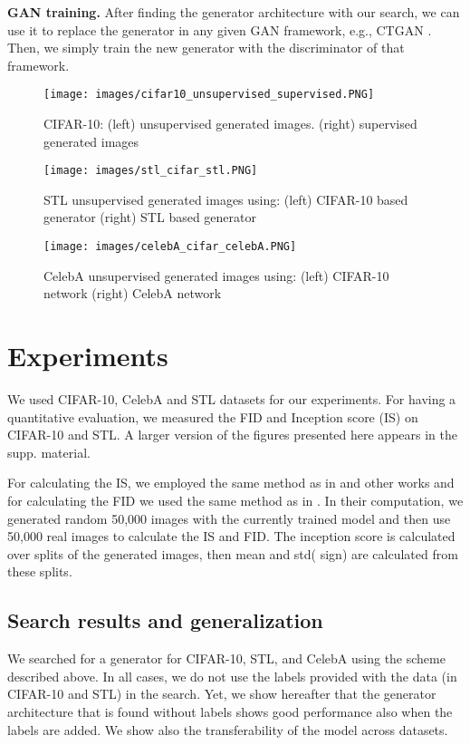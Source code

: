 \documentclass[10pt,twocolumn,letterpaper]{article}
\begin{document}
{\bf GAN training.} After finding the generator architecture with our search, we can use it to replace the generator in any given GAN framework, e.g., CTGAN \cite{ctagn}. Then, we simply train the new generator with the discriminator of that framework.


\begin{figure*}  
    \centering
        \texttt{[image: images/cifar10\_unsupervised\_supervised.PNG]}
        \caption{CIFAR-10: (left) unsupervised generated images. (right) supervised generated images}
        \label{fig:cifar10}
    \end{figure*}
    

\begin{figure*}
    \centering
        \texttt{[image: images/stl\_cifar\_stl.PNG]}
        \caption{STL unsupervised generated images using: (left) CIFAR-10 based generator (right) STL based generator}
        \label{fig:stl10}
    \end{figure*}
    
\begin{figure*}    
    \centering
        \texttt{[image: images/celebA\_cifar\_celebA.PNG]}
        \caption{CelebA unsupervised generated images using: (left) CIFAR-10 network (right) CelebA network}
        \label{fig:celebA}
    \end{figure*}


\section{Experiments}
We used CIFAR-10, CelebA and STL datasets for our experiments.
For having a quantitative evaluation, we measured the FID \cite{fid} and Inception score (IS) \cite{IS} on CIFAR-10 and STL.
A larger version of the figures presented here appears in the supp. material.

For calculating the IS, we employed the same method as in \cite{IS_method} and other works and for calculating the FID we used the same method as in \cite{fid}.
In their computation, we generated random 50,000 images with the currently trained model and then use 50,000 real images to calculate the IS and FID.
The inception score is calculated over  splits of the generated images, then mean and std( sign) are calculated from these splits.



\subsection{Search results and generalization}
We searched for a generator for CIFAR-10, STL, and CelebA using the scheme described above. In all cases, we do not use the labels provided with the data (in CIFAR-10 and STL) in the search. Yet, we show hereafter that the generator architecture that is found without labels shows good performance also when the labels are added. We show also the transferability of the model across datasets. 
\end{document}
